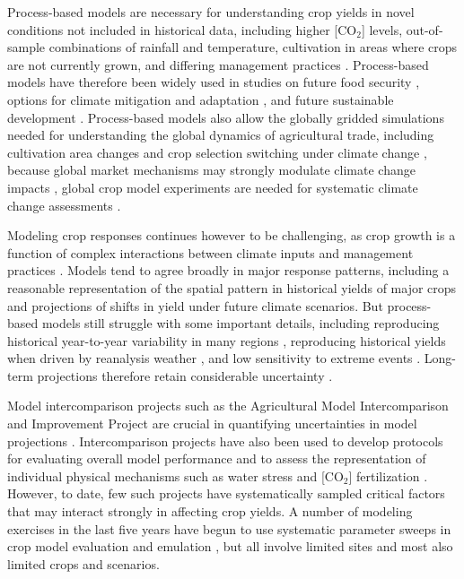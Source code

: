 \documentclass[gmd, manuscript]{copernicus} %
\begin{document}
Process-based models are necessary for understanding crop yields in novel conditions not included in historical data, including higher [CO$_2$] levels, out-of-sample combinations of rainfall and temperature, cultivation in areas where crops are not currently grown, and differing management practices \citep[e.g.][]{pugh_climate_2016, Roberts2017,minoli2019modelling}. Process-based models have therefore been widely used in studies on future food security \citep{wheeler2013climate, Elliott14, frieler2017assessing}, options for climate mitigation \citep{muller2015} and adaptation \citep{challinor2018improving}, and future sustainable development \citep{humpenoder2018large, jagermeyr_reconciling_2017}.
Process-based models also allow the globally gridded simulations needed for understanding  the global dynamics of agricultural trade, including  cultivation area changes and crop selection switching under climate change  \citep{rosenzweig2018,ruane2018}, because global market mechanisms may strongly modulate climate change impacts \citep{Stevanovic2016,hasegawa2018risk}, global crop model experiments are needed for systematic climate change assessments \citep{muller_global_2017}.

Modeling crop responses continues however to be challenging, as crop growth is a function of complex interactions between climate inputs and management practices \citep{Boote13,rotter2011}. 
Models tend to agree broadly in major response patterns, including a reasonable representation of the spatial pattern in historical yields of major crops \citep[e.g.][]{Elliott2015, muller_global_2017} and projections of shifts in yield under future climate scenarios. 
But process-based models still struggle with some important details, including reproducing historical year-to-year variability in many regions \citep[e.g.][]{muller_global_2017, Jag2018}, reproducing historical yields when driven by reanalysis weather \citep[e.g.][]{Glotter14}, and low sensitivity to extreme events \citep[e.g.][]{Glotter15,schewe2019}. 
Long-term projections therefore retain considerable uncertainty \citep{WOLF2002217, JAGTAP200273, Iizumi2010, ANGULO201332, Asseng2013, Asseng2015}. 

Model intercomparison projects such as the Agricultural Model Intercomparison and Improvement Project \citep[AgMIP, ][]{ROSENZWEIG2013} are crucial in quantifying uncertainties in model projections \citep{Rosenzweig2014}. Intercomparison projects have also been used to develop protocols for evaluating overall model performance \citep{Elliott2015, muller_global_2017} and to assess the representation of individual physical mechanisms such as water stress and [CO$_2$] fertilization \citep[e.g.][]{Schauberger2017}.
However, to date, few such projects have systematically sampled critical factors that may interact strongly in affecting crop yields. A number of modeling exercises in the last five years have begun to use
systematic parameter sweeps in crop model evaluation and emulation  \citep[e.g.][]{ruane2014, Markowski2015, Pirttioja2015,FRONZEK20182, Snyder2018, RUIZRAMOS2018}, but all involve limited sites and most also limited crops and scenarios. 
\end{document}
